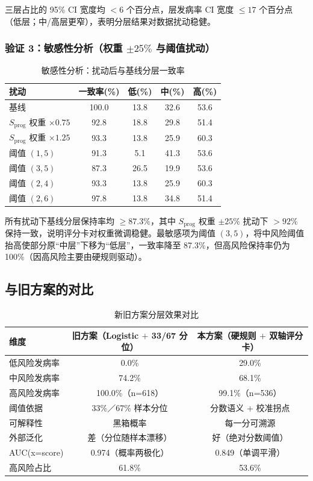 \documentclass{MathorCupmodeling}
\begin{document}
三层占比的 95\% CI 宽度均 $<6$ 个百分点，层发病率 CI 宽度 $\le 17$ 个百分点（低层；中/高层更窄），表明分层结果对数据扰动稳健。

\subsubsection{验证 3：敏感性分析（权重 $\pm 25\%$ 与阈值扰动）}

\begin{table}[H]
\centering\small
\caption{敏感性分析：扰动后与基线分层一致率}\label{tab:q2-sens}
\begin{tabular}{@{}l c c c c@{}}
\toprule
扰动 & 一致率(\%) & 低(\%) & 中(\%) & 高(\%) \\
\midrule
基线                    & 100.0 & 13.8 & 32.6 & 53.6 \\
$S_{\text{prog}}$ 权重 $\times 0.75$ & 92.8 & 18.8 & 29.8 & 51.4 \\
$S_{\text{prog}}$ 权重 $\times 1.25$ & 93.3 & 13.8 & 25.9 & 60.3 \\
阈值 $(1, 5)$            & 91.3 & 5.1  & 41.3 & 53.6 \\
阈值 $(3, 5)$            & 87.3 & 26.5 & 19.9 & 53.6 \\
阈值 $(2, 4)$            & 93.3 & 13.8 & 25.9 & 60.3 \\
阈值 $(2, 6)$            & 97.8 & 13.8 & 34.8 & 51.4 \\
\bottomrule
\end{tabular}
\end{table}

所有扰动下基线分层保持率均 $\ge 87.3\%$，其中 $S_{\text{prog}}$ 权重 $\pm 25\%$ 扰动下 $>92\%$ 保持一致，说明评分卡对权重微调稳健。最敏感项为阈值 $(3, 5)$，将中风险阈值抬高使部分原``中层''下移为``低层''，一致率降至 87.3\%，但高风险保持率仍为 100\%（因高风险主要由硬规则驱动）。

\subsection{与旧方案的对比}

\begin{table}[H]
\centering\small
\caption{新旧方案分层效果对比}\label{tab:q2-compare}
\begin{tabular}{@{}l c c@{}}
\toprule
维度 & 旧方案（Logistic $+$ 33/67 分位） & 本方案（硬规则 $+$ 双轴评分卡） \\
\midrule
低风险发病率 & 0.0\% & 29.0\% \\
中风险发病率 & 74.2\% & 68.1\% \\
高风险发病率 & 100.0\%（n=618） & 99.1\%（n=536） \\
阈值依据 & 33\%／67\% 样本分位 & 分数语义 + 校准拐点 \\
可解释性 & 黑箱概率 & 每一分可溯源 \\
外部泛化 & 差（分位随样本漂移） & 好（绝对分数阈值） \\
AUC(x=score) & 0.974（概率两极化） & 0.849（单调平滑） \\
高风险占比 & 61.8\% & 53.6\% \\
\bottomrule
\end{tabular}
\end{table}
\end{document}
